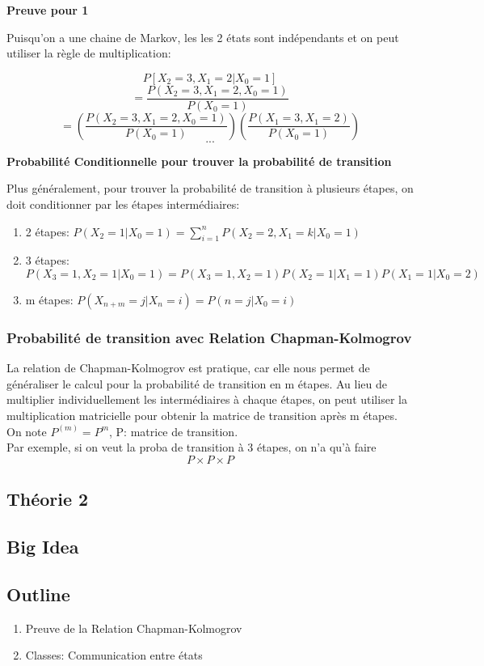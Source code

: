 \documentclass{article}
\begin{document}
\textbf{Preuve pour 1}

Puisqu'on a une chaine de Markov, les les 2 états sont indépendants et on peut
utiliser la règle de multiplication:

$$ P[X_2 = 3 , X_1 = 2 | X_0 = 1] $$
$$ = \frac{P(X_2 = 3, X_1 =2, X_0 = 1)}{P(X_0 = 1)}  $$
$$ = (\frac{P(X_2 = 3, X_1 =2, X_0 = 1)}{P(X_0 = 1)})
(\frac{P(X_1 = 3, X_1 = 2)}{P(X_0=1)} ) $$
$$ ... $$

\textbf{Probabilité Conditionnelle pour trouver la probabilité de transition}

Plus généralement, pour trouver la probabilité de transition à plusieurs
étapes, on doit conditionner par les étapes intermédiaires:

\begin{enumerate}
    \item 2 étapes: $ P(X_2 = 1 | X_0 =1) = \sum^{n}_{i=1} P(X_2 = 2, X_1 = k | X_0=1) $
    \item 3 étapes: $ P(X_3 = 1, X_2 = 1 | X_0 =1) = P(X_3 = 1, X_2 = 1)
	P(X_2 = 1 | X_1 =1) P(X_1 = 1 | X_0 =2)$
    \item m étapes: $ P(X_{n+m} = j | X_n = i) = P(n=j |X_0 = i) $
\end{enumerate}

\subsubsection{Probabilité de transition avec Relation Chapman-Kolmogrov}

La relation de Chapman-Kolmogrov est pratique, car elle nous permet de généraliser
le calcul pour la probabilité de transition en m étapes. Au lieu de multiplier
individuellement les intermédiaires à chaque étapes, on peut utiliser la
multiplication matricielle pour obtenir la matrice de transition après m
étapes. On note $ P^(m) = P^m $, P: matrice de transition.\\

Par exemple, si on veut la proba de transition à 3 étapes, on n'a qu'à faire
$$ P \times P \times P $$

\subsection{Théorie 2}
\subsection*{Big Idea}
\subsection*{Outline}
\begin{enumerate}
    \item Preuve de la Relation Chapman-Kolmogrov
    \item Classes: Communication entre états
\end{enumerate}
\end{document}
